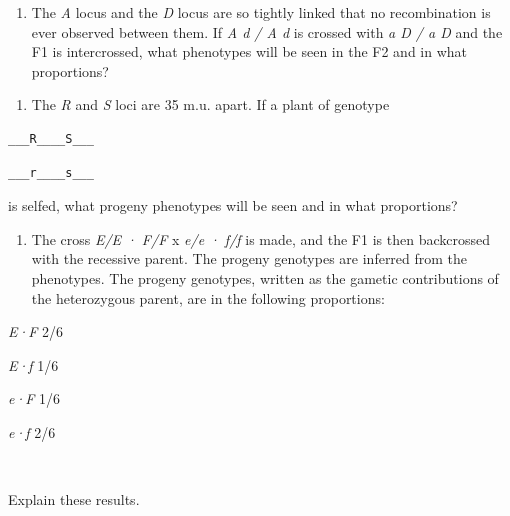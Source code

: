 \documentclass[11pt,]{article}
\providecommand{\tightlist}{%
  \setlength{\itemsep}{0pt}\setlength{\parskip}{0pt}}
\begin{document}
\begin{blackbox}

\begin{enumerate}
\def\labelenumi{\arabic{enumi}.}
\setcounter{enumi}{12}
\tightlist
\item
  The \emph{A} locus and the \emph{D} locus are so tightly linked that
  no recombination is ever observed between them. If \emph{A d / A d} is
  crossed with \emph{a D / a D} and the F1 is intercrossed, what
  phenotypes will be seen in the F2 and in what proportions?
\end{enumerate}

\vspace{19cm}

\end{blackbox}

\begin{blackbox}

\begin{enumerate}
\def\labelenumi{\arabic{enumi}.}
\setcounter{enumi}{13}
\tightlist
\item
  The \emph{R} and \emph{S} loci are 35 m.u. apart. If a plant of
  genotype
\end{enumerate}

\hfill\break

\begin{verbatim}
___R____S___
\end{verbatim}

\hfill\break

\begin{verbatim}
___r____s___
\end{verbatim}

\hfill\break

is selfed, what progeny phenotypes will be seen and in what proportions?

\vspace{15cm}

\end{blackbox}

\begin{blackbox}

\begin{enumerate}
\def\labelenumi{\arabic{enumi}.}
\setcounter{enumi}{14}
\tightlist
\item
  The cross \emph{E/E · F/F} x \emph{e/e · f/f} is made, and the F1 is
  then backcrossed with the recessive parent. The progeny genotypes are
  inferred from the phenotypes. The progeny genotypes, written as the
  gametic contributions of the heterozygous parent, are in the following
  proportions:
\end{enumerate}

\hfill\break

\emph{E·F} 2/6

\emph{E·f} 1/6

\emph{e·F} 1/6

\emph{e·f} 2/6

~

Explain these results.

\vspace{15cm}

\end{blackbox}
\end{document}
